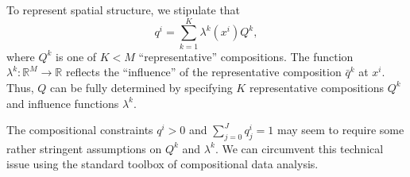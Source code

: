 \documentclass[english]{scrartcl}
\newcommand\R[0]{\mathbb{R}}
\begin{document}
	To represent spatial structure, we stipulate that
	\begin{equation}
		q^i = \sum_{k = 1}^K \lambda^k(x^i) Q^k, \label{spatial_structure}
	\end{equation}
	where $Q^k$ is one of $K < M$ ``representative'' compositions. The function $\lambda^k:\R^M\rightarrow \R$ reflects the ``influence'' of the representative composition $\bar{q}^k$ at $x^i$. Thus, $Q$ can be fully determined by specifying $K$ representative compositions $Q^k$ and influence functions $\lambda^k$.

	The compositional constraints $q^i > 0$ and $\sum_{j = 0}^J q^i_j = 1$ may seem to require some rather stringent assumptions on $Q^k$ and $\lambda^k$. We can circumvent this technical issue using the standard toolbox of compositional data analysis.
\end{document}
